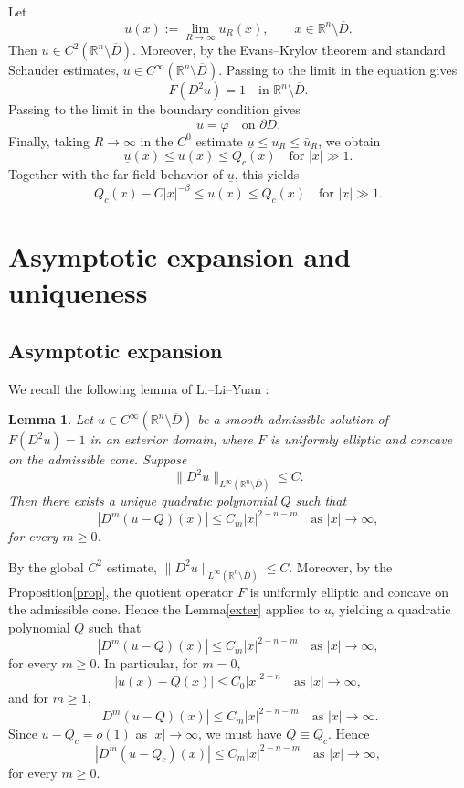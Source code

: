 \documentclass[reqno,a4paper]{amsart}
\numberwithin{equation}{section}
\newtheorem{lemma}{Lemma}[section]
\begin{document}
	Let
	\[
	u(x) := \lim_{R \to \infty} u_R(x), \qquad x \in \mathbb{R}^n \setminus \overline{D}.
	\]
	Then $u \in C^2(\mathbb{R}^n \setminus \overline{D})$. Moreover, by the Evans--Krylov theorem and standard Schauder estimates, $u \in C^\infty(\mathbb{R}^n \setminus \overline{D})$.
	Passing to the limit in the equation gives
	\[
	F(D^2 u) = 1 \quad \text{in } \mathbb{R}^n \setminus \overline{D}.
	\]
	Passing to the limit in the boundary condition gives
	\[
	u = \varphi \quad \text{on } \partial D.
	\]
	Finally, taking $R \to \infty$ in the $C^0$ estimate $\underline{u} \le u_R \le \bar{u}_R$, we obtain
	\begin{equation}
		\underline{u}(x) \le u(x) \le Q_c(x) \quad \text{for } |x| \gg 1.
	\end{equation}
	Together with the far-field behavior of $\underline{u}$, this yields
	\begin{equation}
		Q_c(x) - C|x|^{-\beta} \le u(x) \le Q_c(x) \quad \text{for } |x| \gg 1.
	\end{equation}
	
	\section{Asymptotic expansion and uniqueness}
	\subsection{Asymptotic expansion}
	We recall the following lemma of Li--Li--Yuan \cite{LLY20}:
	
	\begin{lemma}\label{exter}
		Let $u \in C^\infty(\mathbb{R}^n\setminus \overline{D})$ be a smooth admissible solution of $F(D^2u)=1$ in an exterior domain, where $F$ is uniformly elliptic and concave on the admissible cone. Suppose
		\[
		\|D^2u\|_{L^\infty(\mathbb{R}^n\setminus \overline{D})} \le C.
		\]
		Then there exists a unique quadratic polynomial $Q$ such that
		\[
		|D^m(u-Q)(x)| \le C_m |x|^{2-n-m} \quad \text{as } |x| \to \infty,
		\]
		for every $m\ge 0$.
	\end{lemma}
	
	
	By the global $C^2$ estimate, $\|D^2 u\|_{L^\infty(\mathbb{R}^n \setminus \overline{D})} \le C$. 
	Moreover, by the Proposition\eqref{prop}, the quotient operator $F$ is uniformly elliptic 
	and concave on the admissible cone. Hence the Lemma\eqref{exter} applies to $u$, yielding a quadratic polynomial $Q$ such that
	\[
	|D^m(u-Q)(x)| \le C_m |x|^{2-n-m} \quad \text{as } |x| \to \infty,
	\]
	for every $m \ge 0$. In particular, for $m=0$,
	\[
	|u(x)-Q(x)| \le C_0 |x|^{2-n} \quad \text{as } |x| \to \infty,
	\]
	and for $m\ge 1$,
	\[
	|D^m(u-Q)(x)| \le C_m |x|^{2-n-m} \quad \text{as } |x| \to \infty.
	\]
	Since $u - Q_c = o(1)$ as $|x| \to \infty$, we must have $Q \equiv Q_c$. Hence
	\begin{equation}
		|D^m(u-Q_c)(x)| \le C_m |x|^{2-n-m} \quad \text{as } |x| \to \infty,
	\end{equation}
	for every $m \ge 0$.
\end{document}
